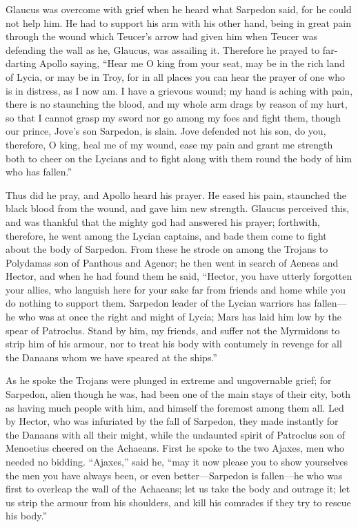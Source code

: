 Glaucus was overcome with grief when he heard what Sarpedon said, for he
could not help him. He had to support his arm with his other hand, being
in great pain through the wound which Teucer’s arrow had given him when
Teucer was defending the wall as he, Glaucus, was assailing it. Therefore
he prayed to far-darting Apollo saying, “Hear me O king from your seat,
may be in the rich land of Lycia, or may be in Troy, for in all places you
can hear the prayer of one who is in distress, as I now am. I have a
grievous wound; my hand is aching with pain, there is no staunching the
blood, and my whole arm drags by reason of my hurt, so that I cannot grasp
my sword nor go among my foes and fight them, though our prince, Jove’s
son Sarpedon, is slain. Jove defended not his son, do you, therefore, O
king, heal me of my wound, ease my pain and grant me strength both to
cheer on the Lycians and to fight along with them round the body of him
who has fallen.”

Thus did he pray, and Apollo heard his prayer. He eased his pain,
staunched the black blood from the wound, and gave him new strength.
Glaucus perceived this, and was thankful that the mighty god had answered
his prayer; forthwith, therefore, he went among the Lycian captains, and
bade them come to fight about the body of Sarpedon. From these he strode
on among the Trojans to Polydamas son of Panthous and Agenor; he then went
in search of Aeneas and Hector, and when he had found them he said,
“Hector, you have utterly forgotten your allies, who languish here for
your sake far from friends and home while you do nothing to support them.
Sarpedon leader of the Lycian warriors has fallen—he who was at once
the right and might of Lycia; Mars has laid him low by the spear of
Patroclus. Stand by him, my friends, and suffer not the Myrmidons to strip
him of his armour, nor to treat his body with contumely in revenge for all
the Danaans whom we have speared at the ships.”

As he spoke the Trojans were plunged in extreme and ungovernable grief;
for Sarpedon, alien though he was, had been one of the main stays of their
city, both as having much people with him, and himself the foremost among
them all. Led by Hector, who was infuriated by the fall of Sarpedon, they
made instantly for the Danaans with all their might, while the undaunted
spirit of Patroclus son of Menoetius cheered on the Achaeans. First he
spoke to the two Ajaxes, men who needed no bidding. “Ajaxes,” said he,
“may it now please you to show yourselves the men you have always been, or
even better—Sarpedon is fallen—he who was first to overleap
the wall of the Achaeans; let us take the body and outrage it; let us
strip the armour from his shoulders, and kill his comrades if they try to
rescue his body.”

